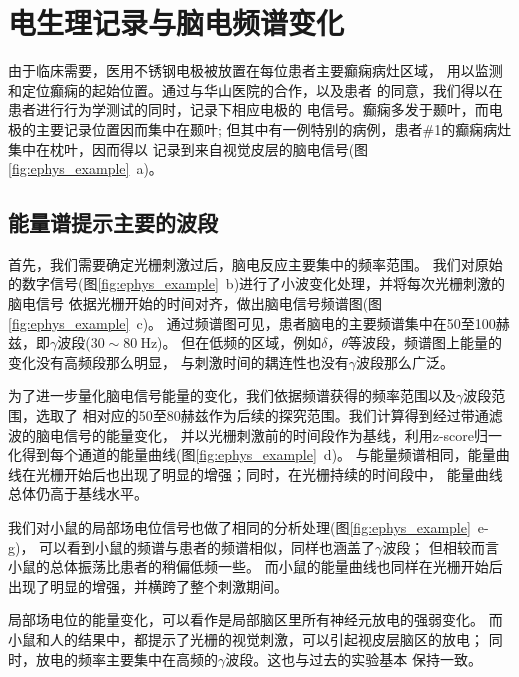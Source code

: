 
\section{电生理记录与脑电频谱变化}
由于临床需要，医用不锈钢电极被放置在每位患者主要癫痫病灶区域，
用以监测和定位癫痫的起始位置。通过与华山医院的合作，以及患者
的同意，我们得以在患者进行行为学测试的同时，记录下相应电极的
电信号。癫痫多发于颞叶，而电极的主要记录位置因而集中在颞叶;
但其中有一例特别的病例，患者\#1的癫痫病灶集中在枕叶，因而得以
记录到来自视觉皮层的脑电信号(图\ref{fig:ephys_example}~a)。

\subsection{能量谱提示主要的波段}
首先，我们需要确定光栅刺激过后，脑电反应主要集中的频率范围。
我们对原始的数字信号(图\ref{fig:ephys_example}~b)进行了小波变化处理，并将每次光栅刺激的脑电信号
依据光栅开始的时间对齐，做出脑电信号频谱图(图\ref{fig:ephys_example}~c)。
通过频谱图可见，患者脑电的主要频谱集中在50至100赫兹，即\(\gamma\)波段(\(30 \sim 80\ \text{Hz}\))。
但在低频的区域，例如\(\delta\)，\(\theta\)等波段，频谱图上能量的变化没有高频段那么明显，
与刺激时间的耦连性也没有\(\gamma\)波段那么广泛。

为了进一步量化脑电信号能量的变化，我们依据频谱获得的频率范围以及\(\gamma\)波段范围，选取了
相对应的50至80赫兹作为后续的探究范围。我们计算得到经过带通滤波的脑电信号的能量变化，
并以光栅刺激前的时间段作为基线，利用z-score归一化得到每个通道的能量曲线(图\ref{fig:ephys_example}~d)。
与能量频谱相同，能量曲线在光栅开始后也出现了明显的增强；同时，在光栅持续的时间段中，
能量曲线总体仍高于基线水平。

我们对小鼠的局部场电位信号也做了相同的分析处理(图\ref{fig:ephys_example}~e-g)，
可以看到小鼠的频谱与患者的频谱相似，同样也涵盖了\(\gamma\)波段；
但相较而言小鼠的总体振荡比患者的稍偏低频一些。
而小鼠的能量曲线也同样在光栅开始后出现了明显的增强，并横跨了整个刺激期间。

局部场电位的能量变化，可以看作是局部脑区里所有神经元放电的强弱变化。
而小鼠和人的结果中，都提示了光栅的视觉刺激，可以引起视皮层脑区的放电；
同时，放电的频率主要集中在高频的\(\gamma\)波段。这也与过去的实验基本
保持一致\cite{lima2011gamma,demiralp2007gamma}。

